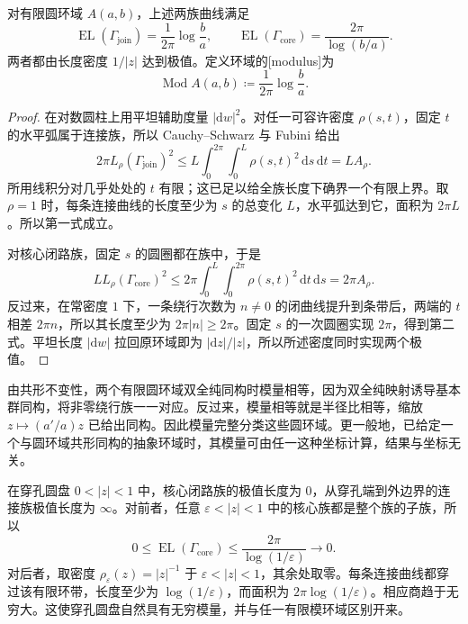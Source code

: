 

\begin{theorem}
	\label{g4:thm:0505:annulus-modulus}
	对有限圆环域 \(A(a,b)\)，上述两族曲线满足
	\begin{equation}
		\label{g4:eq:0505:annulus-extremal-length}
		\operatorname{EL}(\Gamma_{\mathrm{join}})
		=\frac1{2\pi}\log\frac ba,
		\qquad
		\operatorname{EL}(\Gamma_{\mathrm{core}})
		=\frac{2\pi}{\log(b/a)}.
	\end{equation}
	两者都由长度密度 \(1/|z|\) 达到极值。定义环域的[modulus]为
	\[
		\operatorname{Mod}A(a,b)\coloneqq\frac1{2\pi}\log\frac ba.
	\]
\end{theorem}
\begin{proof}
	在对数圆柱上用平坦辅助度量 \(|\mathrm{d}w|^2\)。对任一可容许密度 \(\rho(s,t)\)，固定 \(t\) 的水平弧属于连接族，所以 Cauchy--Schwarz 与 Fubini 给出
	\[
		2\pi L_\rho(\Gamma_{\mathrm{join}})^2
		\le L\int_0^{2\pi}\int_0^L\rho(s,t)^2\,\mathrm{d}s\,\mathrm{d}t
		=LA_\rho.
	\]
	所用线积分对几乎处处的 \(t\) 有限；这已足以给全族长度下确界一个有限上界。取 \(\rho=1\) 时，每条连接曲线的长度至少为 \(s\) 的总变化 \(L\)，水平弧达到它，面积为 \(2\pi L\)。所以第一式成立。

	对核心闭路族，固定 \(s\) 的圆圈都在族中，于是
	\[
		L L_\rho(\Gamma_{\mathrm{core}})^2
		\le2\pi\int_0^L\int_0^{2\pi}\rho(s,t)^2\,\mathrm{d}t\,\mathrm{d}s
		=2\pi A_\rho.
	\]
	反过来，在常密度 \(1\) 下，一条绕行次数为 \(n\ne0\) 的闭曲线提升到条带后，两端的 \(t\) 相差 \(2\pi n\)，所以其长度至少为 \(2\pi|n|\ge2\pi\)。固定 \(s\) 的一次圆圈实现 \(2\pi\)，得到第二式。平坦长度 \(|\mathrm{d}w|\) 拉回原环域即为 \(|\mathrm{d}z|/|z|\)，所以所述密度同时实现两个极值。
\end{proof}

由共形不变性，两个有限圆环域双全纯同构时模量相等，因为双全纯映射诱导基本群同构，将非零绕行族一一对应。反过来，模量相等就是半径比相等，缩放 \(z\mapsto(a'/a)z\) 已给出同构。因此模量完整分类这些圆环域。更一般地，已给定一个与圆环域共形同构的抽象环域时，其模量可由任一这种坐标计算，结果与坐标无关。

\begin{example}
	\label{g4:exm:0505:punctured-modulus}
	在穿孔圆盘 \(0<|z|<1\) 中，核心闭路族的极值长度为 \(0\)，从穿孔端到外边界的连接族极值长度为 \(\infty\)。对前者，任意 \(\varepsilon<|z|<1\) 中的核心族都是整个族的子族，所以
	\[
		0\le\operatorname{EL}(\Gamma_{\mathrm{core}})
		\le\frac{2\pi}{\log(1/\varepsilon)}\longrightarrow0.
	\]
	对后者，取密度 \(\rho_\varepsilon(z)=|z|^{-1}\) 于 \(\varepsilon<|z|<1\)，其余处取零。每条连接曲线都穿过该有限环带，长度至少为 \(\log(1/\varepsilon)\)，而面积为 \(2\pi\log(1/\varepsilon)\)。相应商趋于无穷大。这使穿孔圆盘自然具有无穷模量，并与任一有限模环域区别开来。
\end{example}

